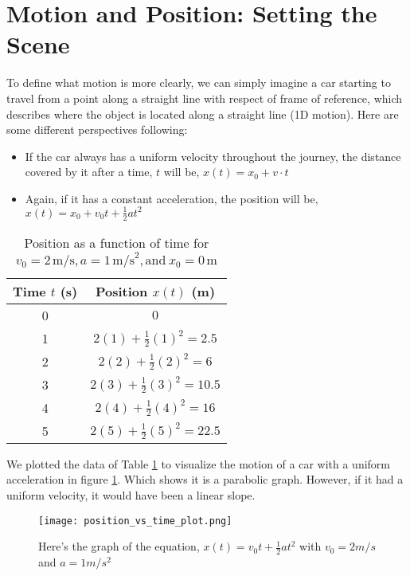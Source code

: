 \documentclass[12pt,a4paper]{article}
\begin{document}
\section*{Motion and Position: Setting the Scene}
To define what motion is more clearly, we can simply imagine a car starting to travel from a point along a straight line with respect of frame of reference, which describes where the object is located along a straight line (1D motion). Here are some different perspectives following:
\begin{itemize}
    \item If the car always has a uniform velocity throughout the journey, the distance covered by it after a time, $t$ will be, $x(t) = x_0 + v \cdot t$ 
    \item Again, if it has a constant acceleration, the position will be, $x(t) = x_0 +v_0t + \frac{1}{2}a t^2$  
\end{itemize}
\begin{table}[h!]
\centering
\begin{tabular}{|c|c|}
\hline
Time \( t \) (s) & Position \( x(t) \) (m) \\
\hline
0 & \( 0 \) \\
1 & \( 2(1) + \frac{1}{2}(1)^2 = 2.5 \) \\
2 & \( 2(2) + \frac{1}{2}(2)^2 = 6 \) \\
3 & \( 2(3) + \frac{1}{2}(3)^2 = 10.5 \) \\
4 & \( 2(4) + \frac{1}{2}(4)^2 = 16 \) \\
5 & \( 2(5) + \frac{1}{2}(5)^2 = 22.5 \) \\
\hline
\end{tabular}
\caption{Position as a function of time for \( v_0 = 2\,\text{m/s}, a = 1\,\text{m/s}^2, \text{and}\ x_0 = 0\, \text{m} \)}
\label{Table 1}
\end{table}

We plotted the data of Table \ref{Table 1} to visualize the motion of a car with a uniform acceleration in figure \ref{fig:enter-label}. Which shows it is a parabolic graph. However, if it had a uniform velocity, it would have been a linear slope.
\begin{figure}
    \centering
    \texttt{[image: position\_vs\_time\_plot.png]}

    \caption{Here's the graph of the equation, $x(t) = v_0t + \frac{1}{2}a t^2$ with $v_0 = 2 m/s$ and $a=1m/s^2$}
    \label{fig:enter-label}
\end{figure}
\end{document}

